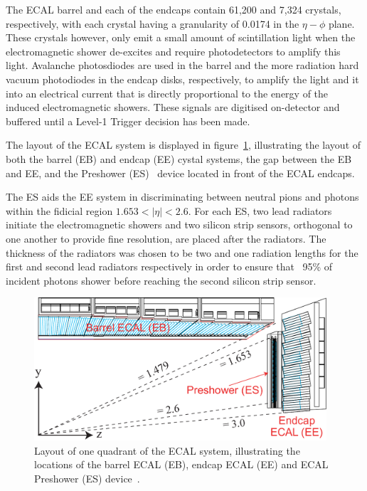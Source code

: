 The ECAL barrel and each of the endcaps contain 61,200 and 7,324 crystals, respectively, with each crystal having a granularity of 0.0174 in the $\eta - \phi$ plane.
These crystals however, only emit a small amount of scintillation light when the electromagnetic shower de-excites and require photodetectors to amplify this light.
Avalanche photosdiodes are used in the barrel and the more radiation hard vacuum photodiodes in the endcap disks, respectively, to amplify the light and it into an electrical current that is directly proportional to the energy of the induced electromagnetic showers.
These signals are digitised on-detector and buffered until a Level-1 Trigger decision has been made.

The layout of the ECAL system is displayed in figure~\ref{fig:ecal}, illustrating the layout of both the barrel (EB) and endcap (EE) cystal systems, the gap between the EB and EE, and the Preshower (ES)~\cite{Loos:539819} device located in front of the ECAL endcaps.

The ES aids the EE system in discriminating between neutral pions and photons within the fidicial region $1.653 < |\eta| < 2.6$.
For each ES, two lead radiators initiate the electromagnetic showers and two silicon strip sensors, orthogonal to one another to provide fine resolution, are placed after the radiators.
The thickness of the radiators was chosen to be two and one radiation lengths for the first and second lead radiators respectively in order to ensure that ~95\% of incident photons shower before reaching the second silicon strip sensor.

\begin{figure}[htbp]
\begin{center}
\includegraphics[width=0.97\textwidth]{figs/cms/ECAL_Transverse_section.pdf}
\caption{Layout of one quadrant of the ECAL system, illustrating the locations of the barrel ECAL (EB), endcap ECAL (EE) and ECAL Preshower (ES) device~\cite{Bayatian:2006nff}.}
\label{fig:ecal}
\end{center}
\end{figure}

